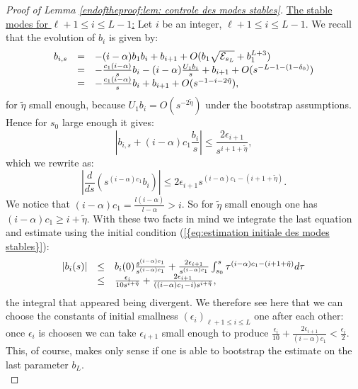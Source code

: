 \documentclass[11pt,a4paper,reqno]{amsart}
\theoremstyle{remark}
\numberwithin{equation}{section}
\begin{document}
\begin{proof}[Proof of Lemma \ref{endoftheproof:lem: controle des modes stables}]
\underline{The stable modes for $\ell+1\leq i \leq L-1$:} Let $i$ be an integer, $\ell+1\leq i \leq L-1$. We recall that the evolution of $b_i$ is given by:
$$
\begin{array}{r c l}
b_{i,s}&=&-(i-\alpha)b_1b_i+b_{i+1}+O(b_1\sqrt{\mathcal{E}_{s_L}}+b_1^{L+3}) \\
&=&-\frac{c_1(i-\alpha)}{s}b_i-(i-\alpha)\frac{U_1b_i}{s}+b_{i+1}+O(s^{-L-1-(1-\delta_0)})\\
&=&-\frac{c_1(i-\alpha)}{s}b_i+b_{i+1}+O(s^{-1-i-2\tilde{\eta}}),
\end{array}
$$
for $\tilde{\eta}$ small enough, because $U_1b_i=O(s^{-2\tilde{\eta}})$ under the bootstrap assumptions. Hence for $s_0$ large enough it gives:
$$
|b_{i,s}+(i-\alpha)c_1\frac{b_i}{s}|\leq \frac{2\epsilon_{i+1}}{s^{i+1+\tilde{\eta}}} ,
$$
which we rewrite as:
\begin{equation} \label{end:eq:edo bi leq L-1}
|\frac{d}{ds}(s^{(i-\alpha)c_1}b_i) |\leq 2\epsilon_{i+1}s^{(i-\alpha)c_1-(i+1+\tilde{\eta})} .
\end{equation}
We notice that $(i-\alpha)c_1=\frac{l(i-\alpha)}{l-\alpha}>i$. So for $\tilde{\eta}$ small enough one has $(i-\alpha)c_1\geq i+\tilde{\eta}$. With these two facts in mind we integrate the last equation and estimate using the initial condition {{\rm (\ref{{eq:estimation initiale des modes stables}})}}:
$$
\begin{array}{r c l}
|b_i(s)|&\leq& b_i(0)\frac{s^{(i-\alpha)c_1}}{s^{(i-\alpha)c_1}}+\frac{2\epsilon_{i+1}}{s^{(i-\alpha)c_1}}\int_{s_0}^s \tau^{(i-\alpha)c_1-(i+1+\tilde{\eta})}d\tau \\
&\leq & \frac{\epsilon_i}{10s^{i+\tilde{\eta}}}+\frac{2\epsilon_{i+1}}{((i-\alpha)c_1-i)s^{i+\tilde{\eta}}} ,
\end{array}
$$
the integral that appeared being divergent. We therefore see here that we can choose the constants of initial smallness $(\epsilon_i)_{\ell+1\leq i \leq L}$ one after each other: once $\epsilon_i$ is choosen we can take $\epsilon_{i+1}$ small enough to produce $\frac{\epsilon_i}{10}+\frac{2\epsilon_{i+1}}{(i-\alpha)c_1}<\frac{\epsilon_i}{2} $. This, of course, makes only sense if one is able to bootstrap the estimate on the last parameter $b_L$.\\


\end{proof}
\end{document}
